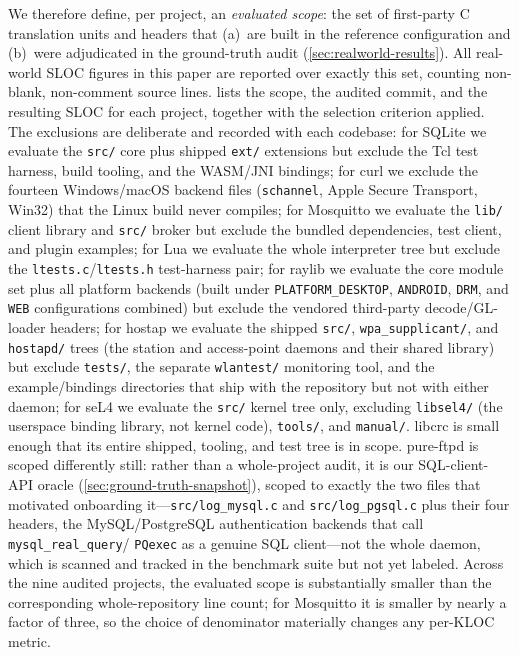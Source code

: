 We therefore define, per project, an \emph{evaluated scope}: the set of
first-party C translation units and headers that (a)~are built in the
reference configuration and (b)~were adjudicated in the ground-truth
audit (\cref{sec:realworld-results}).  All real-world SLOC figures in
this paper are reported over exactly this set, counting non-blank,
non-comment source lines.   lists the scope, the
audited commit, and the resulting SLOC for each project, together with
the selection criterion applied.  The exclusions are deliberate and
recorded with each codebase: for SQLite we evaluate the \texttt{src/}
core plus shipped \texttt{ext/} extensions but exclude the Tcl test
harness, build tooling, and the WASM/JNI bindings; for curl we exclude
the fourteen Windows/macOS backend files (\texttt{schannel}, Apple
Secure Transport, Win32) that the Linux build never compiles; for
Mosquitto we evaluate the \texttt{lib/} client library and \texttt{src/}
broker but exclude the bundled dependencies, test client, and plugin
examples; for Lua we evaluate the whole interpreter tree but exclude
the \texttt{ltests.c}/\texttt{ltests.h} test-harness pair; for raylib
we evaluate the core module set plus all platform backends (built
under \texttt{PLATFORM\_DESKTOP}, \texttt{ANDROID}, \texttt{DRM}, and
\texttt{WEB} configurations combined) but exclude the vendored
third-party decode/GL-loader headers; for hostap we evaluate the
shipped \texttt{src/}, \texttt{wpa\_supplicant/}, and \texttt{hostapd/}
trees (the station and access-point daemons and their shared library)
but exclude \texttt{tests/}, the separate \texttt{wlantest/} monitoring
tool, and the example/bindings directories that ship with the
repository but not with either daemon; for seL4 we evaluate the
\texttt{src/} kernel tree only, excluding \texttt{libsel4/} (the
userspace binding library, not kernel code), \texttt{tools/}, and
\texttt{manual/}.  libcrc is small enough that its entire shipped,
tooling, and test tree is in scope.  pure-ftpd is scoped differently
still: rather than a whole-project audit, it is our SQL-client-API
oracle (\cref{sec:ground-truth-snapshot}), scoped to exactly the two
files that motivated onboarding it---\texttt{src/log\_mysql.c} and
\texttt{src/log\_pgsql.c} plus their four headers, the MySQL/PostgreSQL
authentication backends that call \texttt{mysql\_real\_query}/
\texttt{PQexec} as a genuine SQL client---not the whole daemon, which
is scanned and tracked in the benchmark suite but not yet labeled.
Across the nine audited projects, the evaluated scope is substantially
smaller than the corresponding whole-repository line count; for
Mosquitto it is smaller by nearly a factor of three, so the choice of
denominator materially changes any per-KLOC metric.

